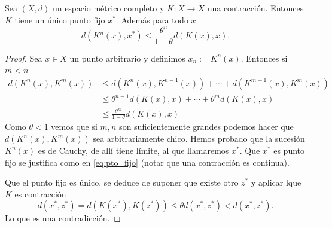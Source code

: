 \begin{teorema}  Sea $(X,d)$ un espacio métrico completo y $K:X\to X$  una contracción. Entonces $K$ tiene un único punto fijo $x^*$. Además para todo $x$
\[d(K^n(x),x^*)\leq \frac{\theta^n}{1-\theta}d(K(x),x).\]
\end{teorema}
\begin{proof} Sea $x\in X$ un punto arbitrario y definimos $x_n:=K^n(x)$. Entonces si $m<n$
\[
\begin{split}
 d(K^n(x),K^m(x))&\leq d(K^n(x),K^{n-1}(x))+\cdots+ d(K^{m+1}(x),K^m(x))\\
 &\leq \theta^{n-1} d(K(x),x)+\cdots + \theta^m d(K(x),x)\\
 &\leq \frac{\theta^m}{1-\theta}d(K(x),x)
 \end{split}
\]
Como $\theta<1$ vemos que si $m,n$ son suficientemente grandes podemos hacer que $ d(K^n(x),K^m(x))$ sea arbitrariamente chico. Hemos probado que la sucesión $K^n(x)$ es de Cauchy, de allí tiene límite, al que llamaremos $x^*$. Que $x^*$ es punto fijo se justifica como en \eqref{eq:pto_fijo} (notar que una contracción es continua).

Que el punto fijo es único, se deduce de suponer que existe otro $z^*$ y aplicar lque $K$ es contracción
\[d(x^* , z^*)=d(K(x^*) , K(z^*))\leq \theta d(x^* , z^*)<d(x^* , z^*).\]
Lo que es una contradicción.
\end{proof}









   





  
  